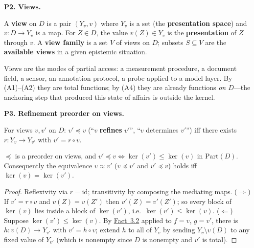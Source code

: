 \textbf{P2. Views.}

\begin{thmdef}

A \textbf{view} on \(D\) is a pair \((Y_v, v)\) where \(Y_v\) is a set (the \textbf{presentation space}) and \(v : D \to Y_v\) is a map. For \(Z \in D\), the value \(v(Z) \in Y_v\) is the \textbf{presentation} of \(Z\) through \(v\). A \textbf{view family} is a set \(V\) of views on \(D\); subsets \(S \subseteq V\) are the \textbf{available views} in a given epistemic situation.
\end{thmdef}

Views are the modes of partial access: a measurement procedure, a document field, a sensor, an annotation protocol, a probe applied to a model layer. By (A1)--(A2) they are total functions; by (A4) they are already functions \emph{on \(D\)}---\hspace{0pt}the anchoring step that produced this state of affairs is outside the kernel.

\textbf{P3. Refinement preorder on views.}

\begin{thmdef}

For views \(v, v'\) on \(D\): \(v' \preceq v\) (``\(v\) \textbf{refines} \(v'\)'', ``\(v\) determines \(v'\)'') iff there exists \(r : Y_v \to Y_{v'}\) with \(v' = r \circ v\).
\end{thmdef}

\begin{thmplain}

\(\preceq\) is a preorder on views, and \(v' \preceq v \iff \ker(v') \le \ker(v)\) in \(\mathrm{Part}(D)\). Consequently the equivalence \(v \approx v'\) (\(v \preceq v'\) and \(v' \preceq v\)) holds iff \(\ker(v) = \ker(v')\).
\end{thmplain}

\begin{proof}

Reflexivity via \(r = \mathrm{id}\); transitivity by composing the mediating maps. (\(\Rightarrow\)) If \(v' = r \circ v\) and \(v(Z) = v(Z')\) then \(v'(Z) = v'(Z')\); so every block of \(\ker(v)\) lies inside a block of \(\ker(v')\), i.e.~\(\ker(v') \le \ker(v)\). (\(\Leftarrow\)) Suppose \(\ker(v') \le \ker(v)\). By \hyperlink{stmt:3.2}{Fact~3.2} applied to \(f = v\), \(g = v'\), there is \(h : v(D) \to Y_{v'}\) with \(v' = h \circ v\); extend \(h\) to all of \(Y_v\) by sending \(Y_v \setminus v(D)\) to any fixed value of \(Y_{v'}\) (which is nonempty since \(D\) is nonempty and \(v'\) is total).
\end{proof}

